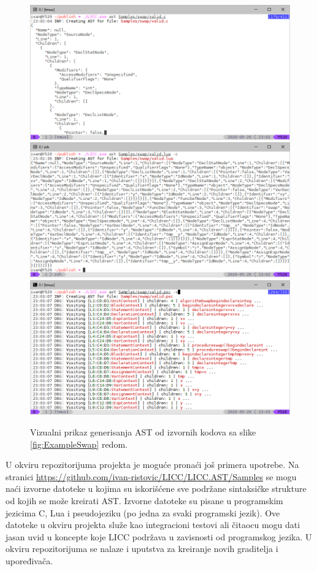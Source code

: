 \begin{figure}[h!]
\centering
\includegraphics[scale=0.56]{images/eval/ast_c.png}
\includegraphics[scale=0.56]{images/eval/ast_lua.png}
\includegraphics[scale=0.56]{images/eval/ast_psc.png}
\caption{Vizualni prikaz generisanja AST od izvornih kodova sa slike \ref{fig:ExampleSwap} redom.}
\label{fig:ExampleSwapAST}
\end{figure}

U okviru repozitorijuma projekta je moguće pronaći još primera upotrebe. Na stranici \url{https://github.com/ivan-ristovic/LICC/LICC.AST/Samples} se mogu naći izvorne datoteke u kojima su iskorišćene sve podržane sintaksičke strukture od kojih se može kreirati AST. Izvorne datoteke su pisane u programskim jezicima C, Lua i pseudojeziku (po jedna za svaki programski jezik). Ove datoteke u okviru projekta služe kao integracioni testovi ali čitaocu mogu dati jasan uvid u koncepte koje LICC podržava u zavisnosti od programskog jezika. U okviru repozitorijuma se nalaze i uputstva za kreiranje novih graditelja i upoređivača.



